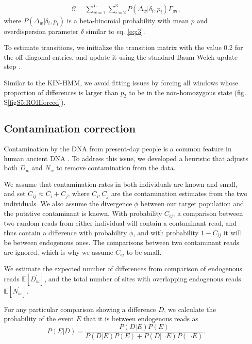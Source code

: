 \documentclass[12pt, letterpaper]{article}
\begin{document}
\begin{align}\label{eq:11}
\mathcal{C} = \sum_{w=1}^L \sum_{i=2}^3 P(\Delta_w|\delta_{i},p_{i}) \Gamma_{wi} ,
\end{align}
where $P(\Delta_w|\delta_{i},p_{i})$ is a beta-binomial probability with mean $p$ and overdispersion parameter $\delta$ similar to eq. \ref{eq:3}.

To estimate transitions, we initialize the transition matrix with the value 0.2 for the off-diagonal entries, and update it using the standard Baum-Welch update step \cite{baum_maximization_1970}.

Similar to the KIN-HMM, we avoid fitting issues by forcing all windows whose proportion of differences is larger than $p_2$ to be in the non-homozygous state (fig. S\ref{figS5:ROHforced}).

\subsection{Contamination correction}\label{contam}
Contamination by the DNA from present-day people is a common feature in human ancient DNA \cite{peyregne_present-day_2020}. To address this issue, we developed a heuristic that adjusts both $D_w$ and $N_w$ to remove contamination from the data.

We assume that contamination rates in both individuals are known and small, and set $C_{ij} \approx C_i + C_j$, where $C_i, C_j$ are the contamination estimates from the two individuals. We also assume the divergence $\phi$ between our target population and the putative contaminant is known. With probability $C_{ij}$, a comparison between two random reads from either individual will contain a contaminant read, and thus contain a difference with probability $\phi$, and with probability $1 - C_{ij}$ it will be between endogenous ones. The comparisons between two contaminant reads are ignored, which is why we assume $C_{ij}$ to be small.

We  estimate the expected number of differences from comparison of endogenous reads $\mathbb{E}[D_w^{'}]$, and the total number of sites with overlapping endogenous reads $\mathbb{E}[N_w^{'}]$. 

For any particular comparison showing a difference $D$, we calculate the probability of the event $E$ that it is between endogenous reads as 
\begin{equation}
    P(E|D) = \frac{P(D|E)P(E)}{P(D|E)P(E) + P(D| \neg E)P( \neg E)}.
\end{equation}
\end{document}

